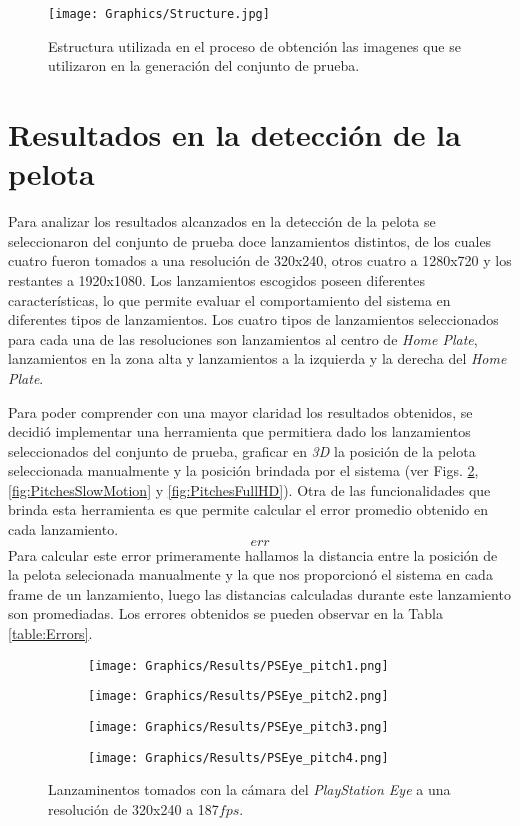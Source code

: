 \begin{figure}[!h]
    \centering
    \texttt{[image: Graphics/Structure.jpg]}
	\caption{Estructura utilizada en el proceso de obtención las imagenes que se utilizaron en la generación del conjunto de prueba.}
	\label{fig:Structure}
\end{figure}

\section{Resultados en la detección de la pelota}

Para analizar los resultados alcanzados en la detección de la pelota se seleccionaron del conjunto de prueba doce lanzamientos distintos, de los cuales cuatro fueron tomados a una resolución de 320x240, otros cuatro a 1280x720 y los restantes a 1920x1080. Los lanzamientos escogidos poseen diferentes características, lo que permite evaluar el comportamiento del sistema en diferentes tipos de lanzamientos. Los cuatro tipos de lanzamientos seleccionados para cada una de las resoluciones son lanzamientos al centro de \textit{Home Plate}, lanzamientos en la zona alta y lanzamientos a la izquierda y la derecha del \textit{Home Plate}.

Para poder comprender con una mayor claridad los resultados obtenidos, se decidió implementar una herramienta que permitiera dado los lanzamientos seleccionados del conjunto de prueba, graficar en \textit{3D} la posición de la pelota seleccionada manualmente y la posición brindada por el sistema (ver Figs. \ref{fig:PitchesPSEye}, \ref{fig:PitchesSlowMotion} y \ref{fig:PitchesFullHD}). Otra de las funcionalidades que brinda esta herramienta es que permite calcular el error promedio obtenido en cada lanzamiento.
$$err$$
Para calcular este error primeramente hallamos la distancia entre la posición de la pelota selecionada manualmente y la que nos proporcionó el sistema en cada frame de un lanzamiento, luego las distancias calculadas durante este lanzamiento son promediadas. Los errores obtenidos se pueden observar en la Tabla \ref{table:Errors}.

\begin{figure}[!h]
    \centering
    \begin{subfigure}[b]{0.48\linewidth}
        \texttt{[image: Graphics/Results/PSEye\_pitch1.png]}
    \end{subfigure}
    \begin{subfigure}[b]{0.48\linewidth}
        \texttt{[image: Graphics/Results/PSEye\_pitch2.png]}
    \end{subfigure}
    \begin{subfigure}[b]{0.48\linewidth}
        \texttt{[image: Graphics/Results/PSEye\_pitch3.png]}
    \end{subfigure}
    \begin{subfigure}[b]{0.48\linewidth}
        \texttt{[image: Graphics/Results/PSEye\_pitch4.png]}
    \end{subfigure}
	\caption{Lanzaminentos tomados con la cámara del \textit{PlayStation Eye} a una resolución de 320x240 a 187$fps$.}
	\label{fig:PitchesPSEye}
\end{figure}

